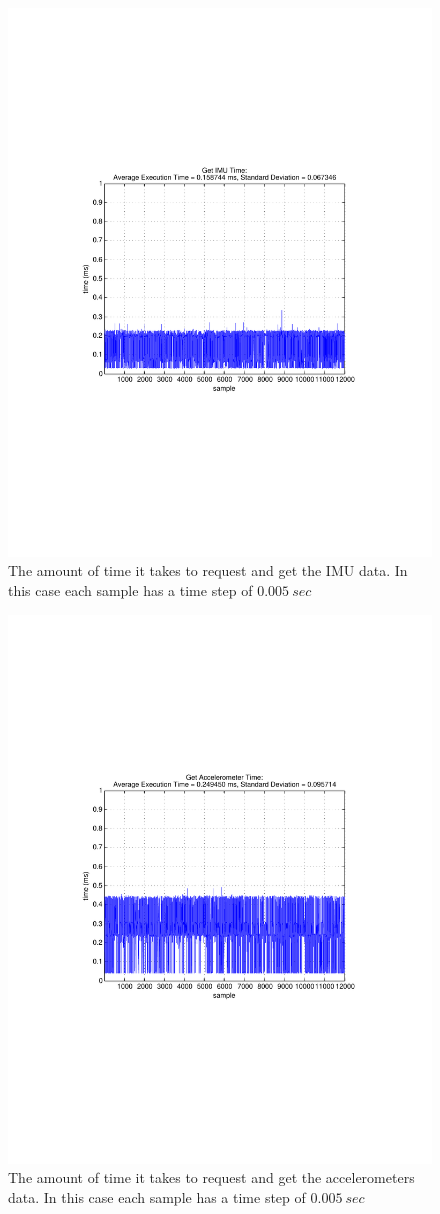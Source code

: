 \begin{itemize}
\begin{figure}[thpb]
  \centering
\includegraphics[width=0.6\columnwidth]{./timingData/getImu.pdf}
  \caption{The amount of time it takes to request and get the IMU data.  In this case each sample has a time step of $0.005~sec$}
  \label{fig:timing-imu}
\end{figure}


\begin{figure}[thpb]
  \centering
\includegraphics[width=0.6\columnwidth]{./timingData/getAcc.pdf}
  \caption{The amount of time it takes to request and get the accelerometers data.  In this case each sample has a time step of $0.005~sec$}
  \label{fig:timing-acc}
\end{figure}




\end{itemize}
